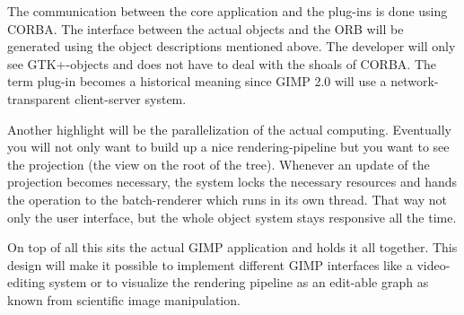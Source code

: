 The communication between the core application and the plug-ins is done using CORBA. The interface between the actual objects and the ORB will be generated using the object descriptions mentioned above. The developer will only see GTK+-objects and does not have to deal with the shoals of CORBA. The term plug-in becomes a historical meaning since GIMP 2.0 will use a network-transparent client-server system. 


Another highlight will be the parallelization of the actual computing.  Eventually you will not only want to build up a nice rendering-pipeline but you want to see the projection (the view on the root of the tree). Whenever an update of the projection becomes necessary, the system locks the necessary resources and hands the operation to the batch-renderer which runs in its own thread. That way not only the user interface, but the whole object system stays responsive all the time. 


On top of all this sits the actual GIMP application and holds it all together.  This design will make it possible to implement different GIMP interfaces like a video-editing system or to visualize the rendering pipeline as an edit-able graph as known from scientific image manipulation.

 
